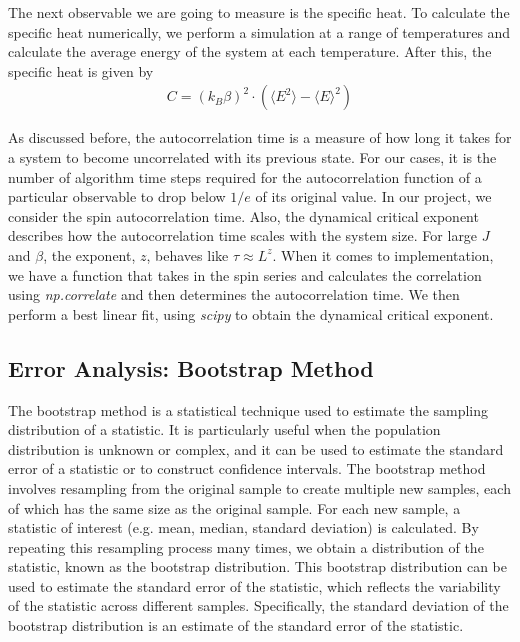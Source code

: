 \documentclass[%
reprint,
 amsmath,amssymb,
 aps,
]{revtex4-2}
\begin{document}
The next observable we are going to measure is the specific heat. 
To calculate the specific heat numerically, we perform a simulation at a range of temperatures and calculate the average energy of the system at each temperature. After this, the specific heat is given by
\begin{align}
    C = (k_B \beta)^2 \cdot (\langle E^2 \rangle-\langle E \rangle^2) 
\end{align}

As discussed before, the autocorrelation time is a measure of how long it takes for a system to become uncorrelated with its previous state. For our cases, it is the number of algorithm time steps required for the autocorrelation function of a particular observable to drop below $1/e$ of its original value. In our project, we consider the spin autocorrelation time. Also, the dynamical critical exponent describes how the autocorrelation time scales with the system size. For large $J$ and $\beta$, the exponent, $z$, behaves like $\tau \approx L^z$. When it comes to implementation, we have a function that takes in the spin series and calculates the correlation using \textit{np.correlate} and then determines the autocorrelation time. We then perform a best linear fit, using \textit{scipy} to obtain the dynamical critical exponent.

\subsection{Error Analysis: Bootstrap Method}
The bootstrap method\cite{bootstrap} is a statistical technique used to estimate the sampling distribution of a statistic. It is particularly useful when the population distribution is unknown or complex, and it can be used to estimate the standard error of a statistic or to construct confidence intervals. The bootstrap method involves resampling from the original sample to create multiple new samples, each of which has the same size as the original sample. For each new sample, a statistic of interest (e.g. mean, median, standard deviation) is calculated. By repeating this resampling process many times, we obtain a distribution of the statistic, known as the bootstrap distribution. This bootstrap distribution can be used to estimate the standard error of the statistic, which reflects the variability of the statistic across different samples. Specifically, the standard deviation of the bootstrap distribution is an estimate of the standard error of the statistic.
\end{document}
